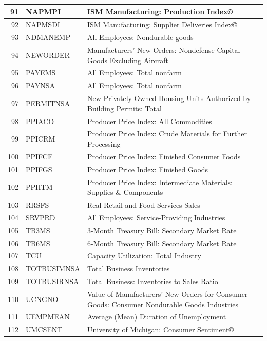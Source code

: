 \documentclass[12pt]{article}
\begin{document}
\begin{table}[ht]
\label{fred data 5}
\centering
\begin{tabular}{r|p{4cm}p{11cm}}
	\hline	
	91 & NAPMPI & ISM Manufacturing: Production Index© \\ 
	\hline
	92 & NAPMSDI & ISM Manufacturing: Supplier Deliveries Index© \\ 
	\hline
	93 & NDMANEMP & All Employees: Nondurable goods \\ 
	\hline
	94 & NEWORDER & Manufacturers' New Orders: Nondefense Capital Goods Excluding Aircraft \\ 
	\hline
	95 & PAYEMS & All Employees: Total nonfarm \\ 
	\hline
	96 & PAYNSA & All Employees: Total nonfarm \\ 
	\hline
	97 & PERMITNSA & New Privately-Owned Housing Units Authorized by Building Permits: Total \\ 
	\hline
	98 & PPIACO & Producer Price Index: All Commodities \\ 
	\hline
	99 & PPICRM & Producer Price Index: Crude Materials for Further Processing \\ 
	\hline
	100 & PPIFCF & Producer Price Index: Finished Consumer Foods \\ 
	\hline
	101 & PPIFGS & Producer Price Index: Finished Goods \\ 
	\hline
	102 & PPIITM & Producer Price Index: Intermediate Materials: Supplies \& Components \\ 
	\hline
	103 & RRSFS & Real Retail and Food Services Sales \\ 
	\hline
	104 & SRVPRD & All Employees: Service-Providing Industries \\ 
	\hline
	105 & TB3MS & 3-Month Treasury Bill: Secondary Market Rate \\ 
	\hline
	106 & TB6MS & 6-Month Treasury Bill: Secondary Market Rate \\ 
	\hline
	107 & TCU & Capacity Utilization: Total Industry \\ 
	\hline
	108 & TOTBUSIMNSA & Total Business Inventories \\ 
	\hline
	109 & TOTBUSIRNSA & Total Business: Inventories to Sales Ratio \\ 
	\hline
	110 & UCNGNO & Value of Manufacturers' New Orders for Consumer Goods: Consumer Nondurable Goods Industries \\ 
	\hline
	111 & UEMPMEAN & Average (Mean) Duration of Unemployment \\ 
	\hline
	112 & UMCSENT & University of Michigan: Consumer Sentiment© \\ 

\end{tabular}
\end{table}
\end{document}
